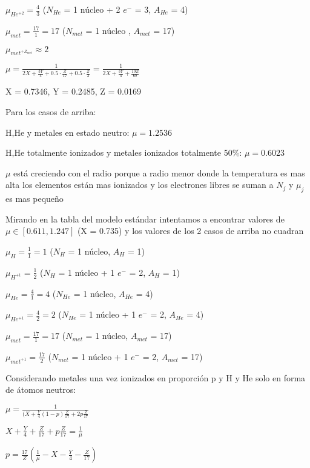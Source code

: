 \documentclass[10pt]{book}
\begin{document}
\begin{description}
$ \mu_{He^{+2}}  = \frac{4}{3} $ ($N_{He}$ = 1 núcleo + 2 $e^-$ = 3, $A_{He}$ = 4)

$ \mu_{met}  = \frac{17}{1} = 17 $ ($N_{met}$ = 1 núcleo , $A_{met}$ = 17)

$ \mu_{met^{+Z_{met}}}  \approx 2  $ 

$ \mu = \frac{1}{2 X + \frac{3 Y}{4} + 0.5 \cdot \frac{Z}{17} + 0.5 \cdot \frac{Z}{2} } = \frac{1}{2 X + \frac{3 Y}{4} + \frac{19 Z}{68} }$

\item X = 0.7346, Y = 0.2485, Z = 0.0169

Para los casos de arriba:

\begin{description}
\item H,He y metales en estado neutro:  $ \mu = 1.2536$
\item H,He totalmente ionizados y metales ionizados totalmente 50\%:  $\mu = 0.6023$
\end{description}

$\mu$ está creciendo con el radio porque a radio menor donde la temperatura es mas alta los elementos están mas ionizados y los electrones libres se suman a $N_j$ y $ \mu_j $ es mas pequeño

Mirando en la tabla del modelo estándar intentamos a encontrar valores de $\mu \in [0.611, 1.247]$ (X = 0.735) y los valores de los 2 casos de arriba no cuadran


$ \mu_H  = \frac{1}{1} = 1$ ($N_H$ = 1 núcleo, $A_H$ = 1)

$ \mu_{H^{+1}}  = \frac{1}{2} $ ($N_H$ = 1 núcleo + 1 $e^-$ = 2, $A_H$ = 1)

$ \mu_{He}  = \frac{4}{1} = 4$ ($N_{He}$ = 1 núcleo, $A_{He}$ = 4)

$ \mu_{He^{+1}}  = \frac{4}{2} = 2$ ($N_{He}$ = 1 núcleo + 1 $e^-$ = 2, $A_{He}$ = 4)

$ \mu_{met}  = \frac{17}{1} = 17$ ($N_{met}$ = 1 núcleo, $A_{met}$ = 17)

$ \mu_{met^{+1}}  = \frac{17}{2}$ ($N_{met}$ = 1 núcleo + 1 $e^{-}$ = 2, $A_{met}$ = 17)

Considerando  metales una vez ionizados en proporción p y H y He solo en forma de átomos neutros:

$ \mu = \frac{1}{(X + \frac{Y}{4}  (1-p)\frac{Z}{17} + 2 p \frac{Z}{17}}$

$ X + \frac{Y}{4} +\frac{Z}{17}+  p \frac{Z}{17} = \frac{1}{\mu} $

$ p = \frac{17}{Z} (\frac{1}{\mu} - X - \frac{Y}{4} - \frac{Z}{17}) $


\end{description}
\end{document}
